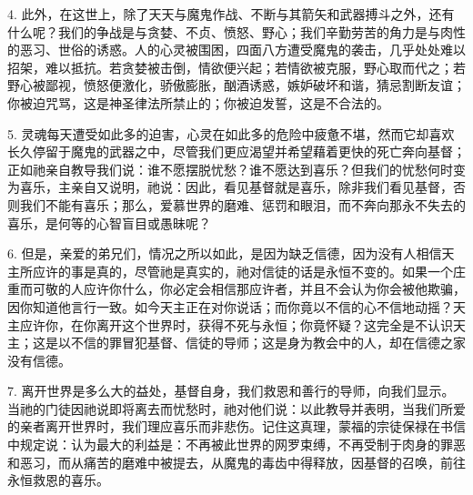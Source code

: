 4. 此外，在这世上，除了天天与魔鬼作战、不断与其箭矢和武器搏斗之外，还有什么呢？我们的争战是与贪婪、不贞、愤怒、野心；我们辛勤劳苦的角力是与肉性的恶习、世俗的诱惑。人的心灵被围困，四面八方遭受魔鬼的袭击，几乎处处难以招架，难以抵抗。若贪婪被击倒，情欲便兴起；若情欲被克服，野心取而代之；若野心被鄙视，愤怒便激化，骄傲膨胀，酗酒诱惑，嫉妒破坏和谐，猜忌割断友谊；你被迫咒骂，这是神圣律法所禁止的；你被迫发誓，这是不合法的。\par

5. 灵魂每天遭受如此多的迫害，心灵在如此多的危险中疲惫不堪，然而它却喜欢长久停留于魔鬼的武器之中，尽管我们更应渴望并希望藉着更快的死亡奔向基督；正如祂亲自教导我们说：\newline{}\newline{}谁不愿摆脱忧愁？谁不愿达到喜乐？但我们的忧愁何时变为喜乐，主亲自又说明，祂说：\newline{}\newline{}因此，看见基督就是喜乐，除非我们看见基督，否则我们不能有喜乐；那么，爱慕世界的磨难、惩罚和眼泪，而不奔向那永不失去的喜乐，是何等的心智盲目或愚昧呢？\par

6. 但是，亲爱的弟兄们，情况之所以如此，是因为缺乏信德，因为没有人相信天主所应许的事是真的，尽管祂是真实的，祂对信徒的话是永恒不变的。如果一个庄重而可敬的人应许你什么，你必定会相信那应许者，并且不会认为你会被他欺骗，因你知道他言行一致。如今天主正在对你说话；而你竟以不信的心不信地动摇？天主应许你，在你离开这个世界时，获得不死与永恒；你竟怀疑？这完全是不认识天主；这是以不信的罪冒犯基督、信徒的导师；这是身为教会中的人，却在信德之家没有信德。\par

7. 离开世界是多么大的益处，基督自身，我们救恩和善行的导师，向我们显示。当祂的门徒因祂说即将离去而忧愁时，祂对他们说：\newline{}\newline{}以此教导并表明，当我们所爱的亲者离开世界时，我们理应喜乐而非悲伤。记住这真理，蒙福的宗徒保禄在书信中规定说：\newline{}\newline{}认为最大的利益是：不再被此世界的网罗束缚，不再受制于肉身的罪恶和恶习，而从痛苦的磨难中被提去，从魔鬼的毒齿中得释放，因基督的召唤，前往永恒救恩的喜乐。\par

